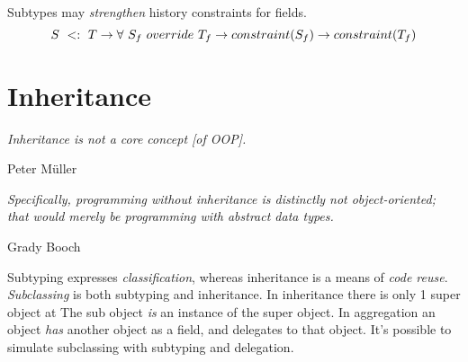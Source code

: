 \documentclass{article}
\begin{document}
\begin{definition}
Subtypes may \textit{strengthen} history constraints for fields.
\begin{equation}
S ~ <: ~ T \rightarrow \forall ~ S_f ~ override{} ~ T_f \rightarrow constraint(S_f) \rightarrow constraint(T_f)
\end{equation}
\end{definition}

\section{Inheritance}

\epigraph{\itshape Inheritance is not a core
concept [of OOP].}{Peter M\"uller}

\epigraph{\itshape Specifically, programming without inheritance is distinctly not object-oriented; that would merely be programming with abstract data types.}{Grady Booch}

Subtyping expresses \textit{classification}, whereas inheritance is a means of \textit{code reuse}. \textit{Subclassing} is both subtyping and inheritance. In inheritance there is only 1 super object at \runtime{} The sub object \textit{is} an instance of the super object. In aggregation an object \textit{has} another object as a field, and delegates to that object. It's possible to simulate subclassing with subtyping and delegation.
\end{document}
